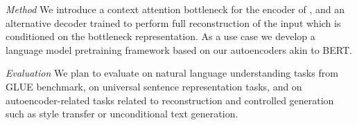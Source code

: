 \vspace{3mm}

\noindent \textit{Method}
We introduce a context attention bottleneck for the encoder of \citet{vaswani17}, and an alternative decoder trained to perform full reconstruction of the input which is conditioned on the bottleneck representation.
As a use case we develop a language model pretraining framework based on our autoencoders akin to BERT. 

\vspace{3mm} 

\noindent \textit{Evaluation} We plan to evaluate on natural language understanding tasks from GLUE benchmark, on universal sentence representation tasks, and on autoencoder-related tasks related to reconstruction and  controlled generation such as style transfer or unconditional text generation. 




